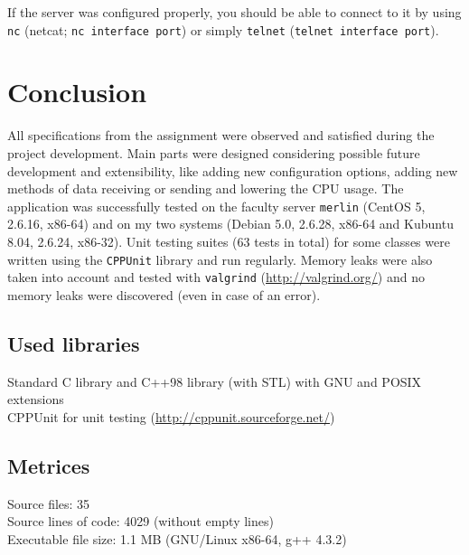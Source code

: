 If the server was configured properly, you should be able to connect to it
by using \texttt{nc} (netcat; \texttt{nc interface port}) or simply
\texttt{telnet} (\texttt{telnet interface port}).

\section{Conclusion}

All specifications from the assignment were observed and satisfied during the
project development. Main parts were designed considering possible future
development and extensibility, like adding new configuration options, adding new
methods of data receiving or sending and lowering the CPU usage. The application
was successfully tested on the faculty server \texttt{merlin} (CentOS 5, 2.6.16,
x86-64) and on my two systems (Debian 5.0, 2.6.28, x86-64 and Kubuntu 8.04,
2.6.24, x86-32). Unit testing suites (63 tests in total) for some classes were
written using the \texttt{CPPUnit} library and run regularly. Memory leaks were
also taken into account and tested with \texttt{valgrind}
(\url{http://valgrind.org/}) and no memory leaks were discovered (even in case
of an error).

\subsection*{Used libraries}

Standard C library and C++98 library (with STL) with GNU and POSIX extensions \\
CPPUnit for unit testing (\url{http://cppunit.sourceforge.net/})

\subsection*{Metrices}

Source files: 35 \\
Source lines of code: 4029 (without empty lines) \\
Executable file size: 1.1 MB (GNU/Linux x86-64, g++ 4.3.2)
